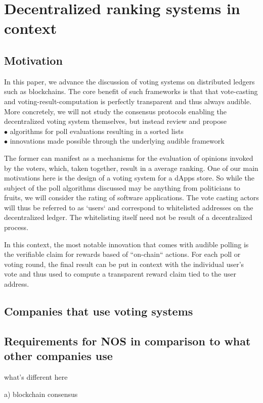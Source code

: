 
\section{Decentralized ranking systems in context}
\subsection{Motivation} 
In this paper, we advance the discussion of voting systems on distributed ledgers such as blockchains. The core benefit of such frameworks is that that vote-casting and voting-result-computation is perfectly transparent and thus always audible.
More concretely, we will not study the consensus protocols enabling the decentralized voting system themselves, but instead review and propose\\
$\bullet$ algorithms for poll evaluations resulting in a sorted lists\\
$\bullet$ innovations made possible through the underlying audible framework

The former can manifest as a mechanisms for the evaluation of opinions invoked by the voters, which, taken together, result in a average ranking. One of our main motivations here is the design of a voting system for a dApps store. So while the subject of the poll algorithms discussed may be anything from politicians to fruits, we will consider the rating of software applications. The vote casting actors will thus be referred to as `users` and correspond to whitelisted addresses on the decentralized ledger. The whitelisting itself need not be result of a decentralized process. 

In this context, the most notable innovation that comes with audible polling is the verifiable claim for rewards based of ``on-chain`` actions. For each poll or voting round, the final result can be put in context with the individual user's vote and thus used to compute a transparent reward claim tied to the user address.

\subsection{Companies that use voting systems}

\subsection{Requirements for NOS in comparison to what other companies use}
what's different here 

a) blockchain consensus 

